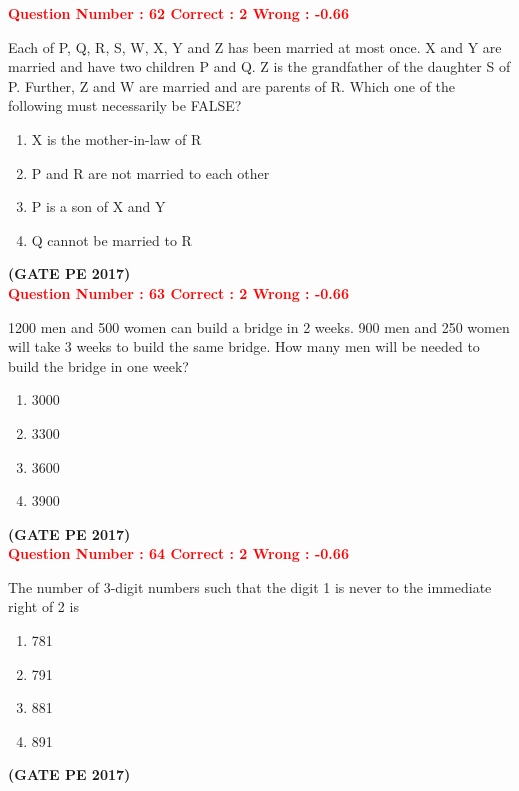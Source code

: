 \documentclass[12pt]{article}
\begin{document}
{\textcolor{red}{\textbf{Question Number : 62 \hfill Correct : 2  Wrong : -0.66}}


Each of P, Q, R, S, W, X, Y and Z has been married at most once. X and Y are married and have two children P and Q. Z is the grandfather of the daughter S of P. Further, Z and W are married and are parents of R. Which one of the following must necessarily be FALSE?

\begin{enumerate}[label=(\Alph*)]
    \item X is the mother-in-law of R
    \item P and R are not married to each other
    \item P is a son of X and Y
    \item Q cannot be married to R
\end{enumerate}

\hfill\textbf{(GATE PE 2017)}\\[0.6cm]


\textcolor{red}{\textbf{Question Number : 63 \hfill Correct : 2  Wrong : -0.66}}

1200 men and 500 women can build a bridge in 2 weeks. 900 men and 250 women will take 3 weeks to build the same bridge. How many men will be needed to build the bridge in one week?

\begin{enumerate}[label=(\Alph*)]
    \item 3000
    \item 3300
    \item 3600
    \item 3900
\end{enumerate}

\hfill\textbf{(GATE PE 2017)}\\[0.6cm]


\textcolor{red}{\textbf{Question Number : 64 \hfill Correct : 2  Wrong : -0.66}}


The number of 3-digit numbers such that the digit 1 is never to the immediate right of 2 is

\begin{enumerate}[label=(\Alph*)]
    \item 781
    \item 791
    \item 881
    \item 891
\end{enumerate}

\hfill\textbf{(GATE PE 2017)}\\[0.6cm]

}
\end{document}
